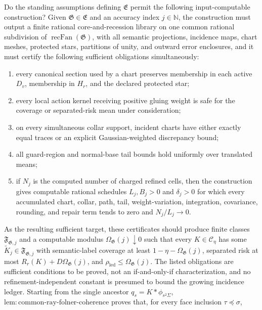 Do the standing assumptions defining \(\mathfrak E\) permit the following input-computable construction?  Given \(\mathfrak G\in\mathfrak E\) and an accuracy index \(j\in\mathbb N\), the construction must output a finite rational core-and-recession library on one common rational subdivision of \(\operatorname{recFan}(\mathfrak G)\), with all semantic projections, incidence maps, chart meshes, protected stars, partitions of unity, and outward error enclosures, and it must certify the following sufficient obligations simultaneously:
\begin{enumerate}
\item every canonical section used by a chart preserves membership in each active \(D_v\), membership in \(H_r\), and the declared protected star;
\item every local action kernel receiving positive gluing weight is safe for the coverage or separated-risk mean under consideration;
\item on every simultaneous collar support, incident charts have either exactly equal traces or an explicit Gaussian-weighted discrepancy bound;
\item all guard-region and normal-base tail bounds hold uniformly over translated means;
\item if \(N_j\) is the computed number of charged refined cells, then the construction gives computable rational schedules \(L_j,B_j>0\) and \(\delta_j>0\) for which every accumulated chart, collar, path, tail, weight-variation, integration, covariance, rounding, and repair term tends to zero and \(N_j/L_j\to0\).
\end{enumerate}
As the resulting sufficient target, these certificates should produce finite classes \(\mathfrak F_{\mathfrak G,j}\) and a computable modulus \(\Omega_{\mathfrak G}(j)\downarrow0\) such that every \(K\in\mathcal C_\eta\) has some \(\widetilde K_j\in\mathfrak F_{\mathfrak G,j}\) with semantic-label coverage at least \(1-\eta-\Omega_{\mathfrak G}(j)\), separated risk at most \(R_r(K)+D\Omega_{\mathfrak G}(j)\), and \(\rho_{\mathrm{led}}\leq\Omega_{\mathfrak G}(j)\).  The listed obligations are sufficient conditions to be proved, not an if-and-only-if characterization, and no refinement-independent constant is presumed to bound the growing incidence ledger.
Starting from the single ancestor \(q_s=K*\phi_{s^2\Sigma}\), \(\mathrm{lem:common\mbox{-}ray\mbox{-}folner\mbox{-}coherence}\) proves that, for every face inclusion \(\tau\preceq\sigma\),
